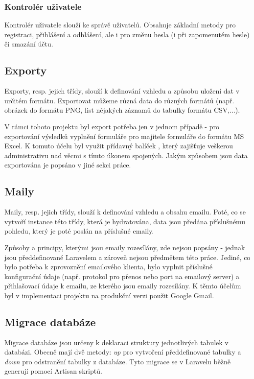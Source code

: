 		\subsubsection{Kontrolér uživatele}
		Kontrolér uživatele slouží ke správě uživatelů. Obsahuje základní metody pro registraci, přihlášení a odhlášení, ale i pro změnu hesla (i při zapomenutém hesle) či smazání účtu.
	
	\subsection{Exporty}\label{sec:exports}
	Exporty, resp. jejich třídy, slouží k definování vzhledu a způsobu uložení dat v určitém formátu. Exportovat můžeme různá data do různých formátů (např. obrázek do formátu PNG, list nějakých záznamů do tabulky formátu CSV,...).
	
	V rámci tohoto projektu byl export potřeba jen v jednom případě - pro exportování výsledků vyplnění formuláře pro majitele formuláře do formátu MS Excel. K tomuto účelu byl využit přídavný balíček , který zajišťuje veškerou administrativu nad věcmi s tímto úkonem spojených. Jakým způsobem jsou data exportována je popsáno v jiné sekci práce.
	
	\subsection{Maily}
	Maily, resp. jejich třídy, slouží k definování vzhledu a obsahu emailu. Poté, co se vytvoří instance této třídy, která je hydratována, data jsou předána příslušnému pohledu, který je poté poslán na příslušné emaily.
	
	Způsoby a principy, kterými jsou emaily rozesílány, zde nejsou popsány - jednak jsou předdefinované Laravelem a zároveň nejsou předmětem této práce. Jediné, co bylo potřeba k zprovoznění emailového klienta, bylo vyplnit příslušné konfigurační údaje (např. protokol pro přenos nebo port na emailový server) a přihlašovací údaje k emailu, ze kterého jsou emaily rozesílány. K těmto účelům byl v implementaci projektu na produkční verzi použit Google Gmail.
	
	\subsection{Migrace databáze}
	Migrace databáze jsou určeny k deklaraci struktury jednotlivých tabulek v databázi. Obecně mají dvě metody: \textit{up} pro vytvoření předdefinované tabulky a \textit{down} pro odstranění tabulky z databáze. Tyto migrace se v Laravelu běžně generují pomocí Artisan skriptů.
	
